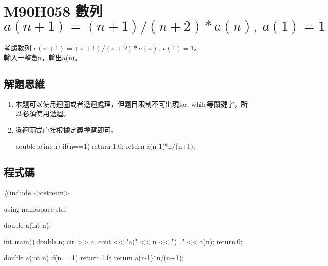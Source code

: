 \section{M90H058 數列 $a(n+1)=(n+1)/(n+2)*a(n),\ a(1)=1$}
考慮數列 $a(n+1)=(n+1)/(n+2)*a(n),\ a(1)=1$。\\輸入一整數n，輸出a(n)。
\subsection{解題思維}

\begin{enumerate}
	\item 本題可以使用迴圈或者遞迴處理，但題目限制不可出現for, while等關鍵字，所以必須使用遞迴。
	\item 遞迴函式直接根據定義撰寫即可。
	\begin{inside}
	double a(int n) {
		if(n==1) return 1.0;
		return a(n-1)*n/(n+1);
	}			
	\end{inside}
\end{enumerate} 

\subsection{程式碼}
\begin{cppcode}
	#include <iostream>

	using namespace std;
	
	double a(int n);
	
	int main()
	{
		double n;
		cin >> n;
		cout << "a(" << n << ")=" << a(n);
		return 0;
	}
	
	double a(int n) {
		if(n==1) return 1.0;
		return a(n-1)*n/(n+1);
	}
\end{cppcode}
